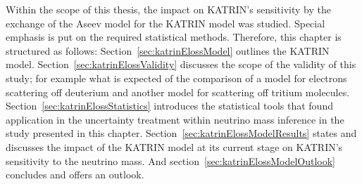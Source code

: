 Within the scope of this thesis, the impact on KATRIN's sensitivity by the exchange of the Aseev model for the KATRIN model was studied. Special emphasis is put on the required statistical methods. Therefore, this chapter is structured as follows: Section~\ref{sec:katrinElossModel} outlines the KATRIN model. Section~\ref{sec:katrinElossValidity} discusses the scope of the validity of this study; for example what is expected of the comparison of a model for electrons scattering off deuterium and another model for scattering off tritium molecules. Section~\ref{sec:katrinElossStatistics} introduces the statistical tools that found application in the uncertainty treatment within neutrino mass inference in the study presented in this chapter. Section~\ref{sec:katrinElossModelResults} states and discusses the impact of the KATRIN model at its current stage on KATRIN's sensitivity to the neutrino mass. And section~\ref{sec:katrinElossModelOutlook} concludes and offers an outlook.

